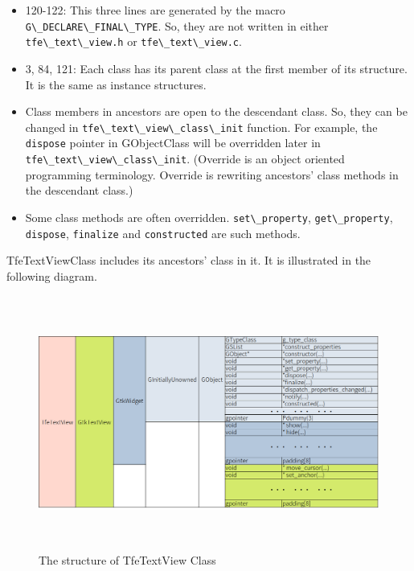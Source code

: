 \begin{itemize}
\tightlist
\item
  120-122: This three lines are generated by the macro
  \passthrough{\lstinline!G\_DECLARE\_FINAL\_TYPE!}. So, they are not
  written in either \passthrough{\lstinline!tfe\_text\_view.h!} or
  \passthrough{\lstinline!tfe\_text\_view.c!}.
\item
  3, 84, 121: Each class has its parent class at the first member of its
  structure. It is the same as instance structures.
\item
  Class members in ancestors are open to the descendant class. So, they
  can be changed in
  \passthrough{\lstinline!tfe\_text\_view\_class\_init!} function. For
  example, the \passthrough{\lstinline!dispose!} pointer in GObjectClass
  will be overridden later in
  \passthrough{\lstinline!tfe\_text\_view\_class\_init!}. (Override is
  an object oriented programming terminology. Override is rewriting
  ancestors' class methods in the descendant class.)
\item
  Some class methods are often overridden.
  \passthrough{\lstinline!set\_property!},
  \passthrough{\lstinline!get\_property!},
  \passthrough{\lstinline!dispose!}, \passthrough{\lstinline!finalize!}
  and \passthrough{\lstinline!constructed!} are such methods.
\end{itemize}

TfeTextViewClass includes its ancestors' class in it. It is illustrated
in the following diagram.

\begin{figure}
\centering
\includegraphics[width=16.02cm,height=8.34cm]{../image/TfeTextViewClass.png}
\caption{The structure of TfeTextView Class}
\end{figure}

